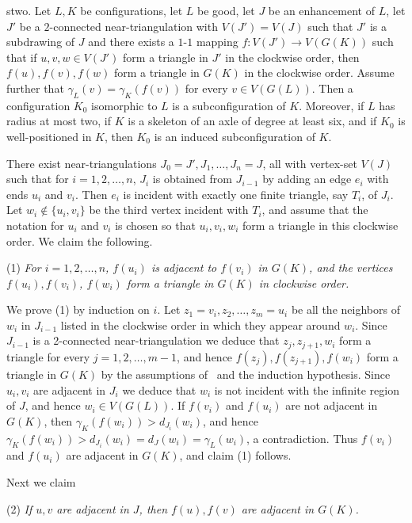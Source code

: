 \thm stwo.  Let $L,K$ be configurations, let $L$ be good,
let $J$ be an enhancement of $L$,
let $J'$ be a $2$-connected near-triangulation with $V(J')=V(J)$ such that
$J'$ is a subdrawing of $J$ and there exists a $1$-$1$ mapping
$f:V(J')\to V(G(K))$ such that if  
$u,v,w\in V(J')$ form a triangle in $J'$ in the clockwise order, then
$f(u),f(v), f(w)$ form a triangle in $G(K)$ in the clockwise
order.  Assume further that $\gamma_L(v)=\gamma_K(f(v))$ for every
$v\in V(G(L))$.
Then a configuration $K_0$ isomorphic to $L$ is a
subconfiguration of $K$.  Moreover, if $L$  has radius at most two, if
$K$ is a skeleton of an axle of degree at least six, and if $K_0$ is
well-positioned in $K$, then $K_0$ is an induced subconfiguration of $K$.



\pf There exist near-triangulations $J_0=J',J_1,\dots, J_n=J$, all with 
vertex-set
$V(J)$ such that for $i=1,2,\dots, n$, $J_i$ is obtained from $J_{i-1}$ 
by adding an
edge $e_i$ with ends $u_i$ and $v_i$.  Then $e_i$ is incident with exactly 
one finite
triangle, say $T_i$, of $J_i$.  Let $w_i\not\in \{u_i,v_i\}$ be the third 
vertex
incident with $T_i$, and assume that the notation for
$u_i$ and $v_i$ is chosen so that $u_i,v_i,w_i$
form a triangle in this clockwise order.  We claim the following.
\item{(1)} {\sl For $i=1,2,\dots, n$, $f(u_i)$ is adjacent to $f(v_i)$ 
in $G(K)$,
and the vertices $f(u_i), f(v_i)$, $f(w_i)$ form a triangle in $G(K)$ 
in clockwise order.}

We prove (1) by induction on $i$.  Let $z_1=v_i,z_2,\dots,z_m=u_i$ be 
all the neighbors of $w_i$ in $J_{i-1}$
listed in the clockwise order in which they appear around $w_i$.
Since $J_{i-1}$ is a 2-connected near-triangulation we deduce that
$z_j,z_{j+1}, w_i$ form a triangle for every $j=1,2,\dots, m-1$, and
hence $f(z_j),  f(z_{j+1}),
f(w_i)$ form a triangle in $G(K)$ by the assumptions of \stwo\ and the 
induction
hypothesis.  Since $u_i,v_i$ are adjacent in $J_i$ we deduce that $w_i$ 
is not incident
with the infinite region of $J$, and hence $w_i\in V(G(L))$.  If $f(v_i)$ 
and $f(u_i)$ are
not adjacent in $G(K)$, then $\gamma_K(f(w_i))> d_{J_i}(w_i)$, 
and hence $\gamma_K(f(w_i))> d_{J_i}(w_i)=d_J(w_i)= \gamma_L(w_i)$, a 
contradiction.  Thus $f(v_i)$ and $f(u_i)$ are adjacent in $G(K)$, and 
claim (1) follows.

Next we claim
\item{(2)} {\sl If $u,v$ are adjacent in $J$, then $f(u), f(v)$ are adjacent 
in $G(K)$.}


